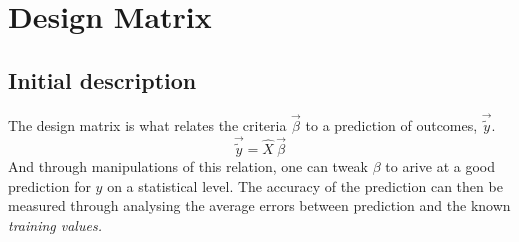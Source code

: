 \documentclass[
    12pt, %
    a4paper, 
    ]{article}
\begin{document}
\section{Design Matrix}

\subsection{Initial description}
The design matrix is what relates the criteria $\vec{\beta}$ to a prediction of outcomes, $\vec{\tilde{y}}$.
\begin{equation}
    \vec{\tilde{y}} = \hat{X}\,\vec{\beta}
\end{equation}
And through manipulations of this relation, one can tweak $\beta$ to arive at a good prediction for $y$ on a 
statistical level. The accuracy of the prediction can then be measured through analysing the average errors between
prediction and the known \it{training values}. 

\end{document}
